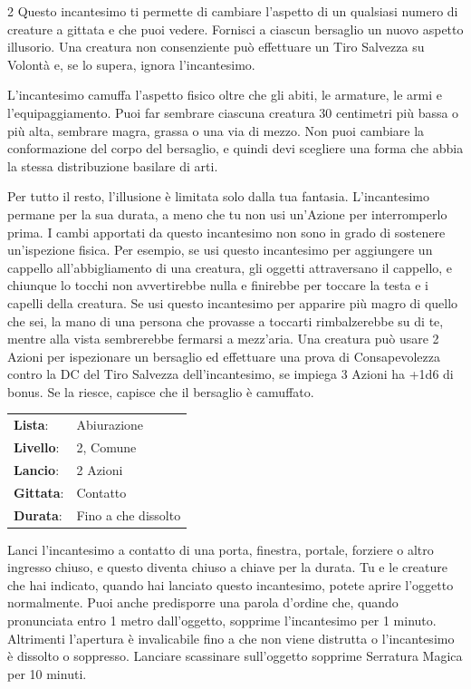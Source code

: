 \begin{multicols}{2}
Questo incantesimo ti permette di cambiare l'aspetto di un qualsiasi numero di creature a gittata e che puoi vedere. Fornisci a ciascun bersaglio un nuovo aspetto illusorio. Una creatura non consenziente può effettuare un Tiro Salvezza su Volontà e, se lo supera, ignora l'incantesimo.

L'incantesimo camuffa l'aspetto fisico oltre che gli abiti, le armature, le armi e l'equipaggiamento. Puoi far sembrare ciascuna creatura 30 centimetri più bassa o più alta, sembrare magra, grassa o una via di mezzo. Non puoi cambiare la conformazione del corpo del bersaglio, e quindi devi scegliere una forma che abbia la stessa distribuzione basilare di arti.

Per tutto il resto, l'illusione è limitata solo dalla tua fantasia. L'incantesimo permane per la sua durata, a meno che tu non usi un'Azione per interromperlo prima. I cambi apportati da questo incantesimo non sono in grado di sostenere un'ispezione fisica. Per esempio, se usi questo incantesimo per aggiungere un cappello all'abbigliamento di una creatura, gli oggetti attraversano il cappello, e chiunque lo tocchi non avvertirebbe nulla e finirebbe per toccare la testa e i capelli della creatura.
Se usi questo incantesimo per apparire più magro di quello che sei, la mano di una persona che provasse a toccarti rimbalzerebbe su di te, mentre alla vista sembrerebbe fermarsi a mezz'aria. Una creatura può usare 2 Azioni per ispezionare un bersaglio ed effettuare una prova di Consapevolezza contro la DC del Tiro Salvezza dell'incantesimo, se impiega 3 Azioni ha +1d6 di bonus. Se la riesce, capisce che il bersaglio è camuffato.

\noindent\begin{tabularx}{\linewidth}{p{1.9cm}X}
	\rowcolor{gray!20}\textbf{Lista}: & Abiurazione \\
	\textbf{Livello}: & 2, Comune \\
	\rowcolor{gray!20}\textbf{Lancio}: & 2 Azioni \\
	\textbf{Gittata}: & Contatto \\
	\rowcolor{gray!20}\textbf{Durata}: & Fino a che dissolto \\
\end{tabularx}\smallskip

\label{Arcane Lock}Lanci l'incantesimo a contatto di una porta, finestra, portale, forziere o altro ingresso chiuso, e questo diventa chiuso a chiave per la durata. Tu e le creature che hai indicato, quando hai lanciato questo incantesimo, potete aprire l'oggetto normalmente. Puoi anche predisporre una parola d'ordine che, quando pronunciata entro 1 metro dall'oggetto, sopprime l'incantesimo per 1 minuto. Altrimenti l'apertura è invalicabile fino a che non viene distrutta o l'incantesimo è dissolto o soppresso. Lanciare scassinare sull'oggetto sopprime Serratura Magica per 10 minuti.


\end{multicols}
